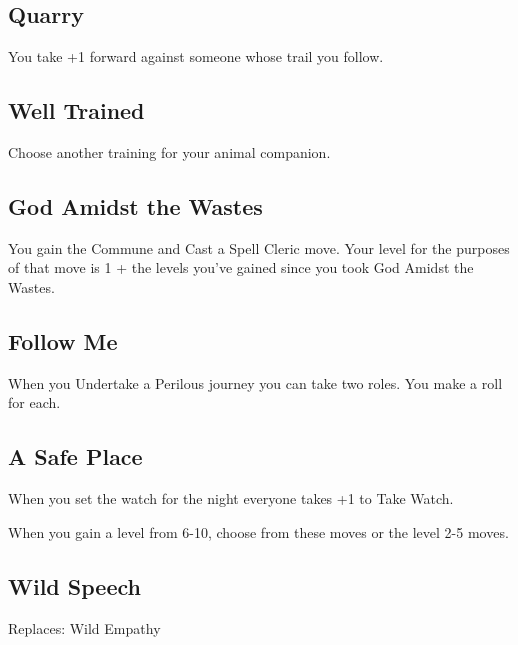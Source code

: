          
\subsection{Quarry}   
         

You take +1 forward against someone whose trail you follow.

         
\subsection{Well Trained}   
         

Choose another training for your animal companion.

         
\subsection{God Amidst the Wastes}    
         

You gain the Commune and Cast a Spell Cleric move. Your level for the purposes of that move is 1 + the levels you've gained since you took God Amidst the Wastes.

         
\subsection{Follow Me}   
         

When you Undertake a Perilous journey you can take two roles. You make a roll for each.

         
\subsection{A Safe Place}    
         

When you set the watch for the night everyone takes +1 to Take Watch.

         
\startInstructions
When you gain a level from 6-10, choose from these moves or the level 2-5 moves.
\stopInstructions
         
\subsection{Wild Speech}    
         

Replaces: Wild Empathy

